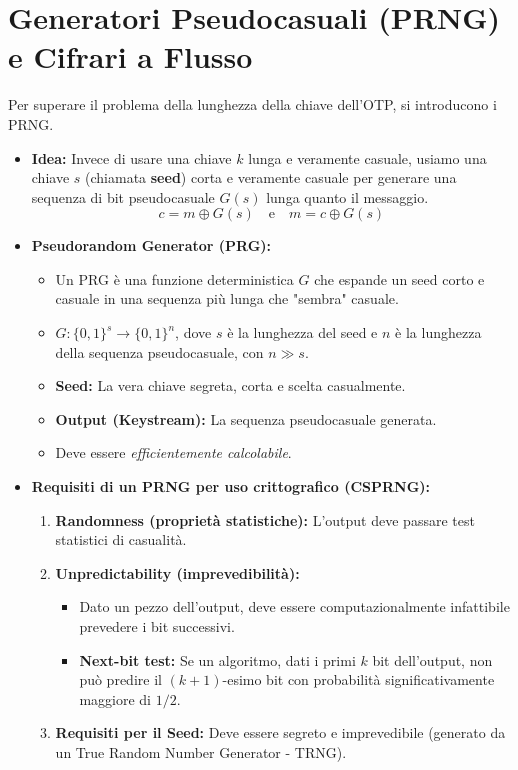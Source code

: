\section{Generatori Pseudocasuali (PRNG) e Cifrari a Flusso}
Per superare il problema della lunghezza della chiave dell'OTP, si introducono i PRNG.
\begin{itemize}
    \item \textbf{Idea:} Invece di usare una chiave $k$ lunga e veramente casuale, usiamo una chiave $s$ (chiamata \textbf{seed}) corta e veramente casuale per generare una sequenza di bit pseudocasuale $G(s)$ lunga quanto il messaggio.
    \[ c = m \oplus G(s) \quad \text{e} \quad m = c \oplus G(s) \]
    \item \textbf{Pseudorandom Generator (PRG):}
    \begin{itemize}
        \item Un PRG è una funzione deterministica $G$ che espande un seed corto e casuale in una sequenza più lunga che "sembra" casuale.
        \item $G: \{0,1\}^s \to \{0,1\}^n$, dove $s$ è la lunghezza del seed e $n$ è la lunghezza della sequenza pseudocasuale, con $n \gg s$.
        \item \textbf{Seed:} La vera chiave segreta, corta e scelta casualmente.
        \item \textbf{Output (Keystream):} La sequenza pseudocasuale generata.
        \item Deve essere \textit{efficientemente calcolabile}.
    \end{itemize}
    \item \textbf{Requisiti di un PRNG per uso crittografico (CSPRNG):}
    \begin{enumerate}
        \item \textbf{Randomness (proprietà statistiche):} L'output deve passare test statistici di casualità.
        \item \textbf{Unpredictability (imprevedibilità):}
        \begin{itemize}
            \item Dato un pezzo dell'output, deve essere computazionalmente infattibile prevedere i bit successivi.
            \item \textbf{Next-bit test:} Se un algoritmo, dati i primi $k$ bit dell'output, non può predire il $(k+1)$-esimo bit con probabilità significativamente maggiore di $1/2$.
        \end{itemize}
        \item \textbf{Requisiti per il Seed:} Deve essere segreto e imprevedibile (generato da un True Random Number Generator - TRNG).

\end{enumerate}
\end{itemize}
